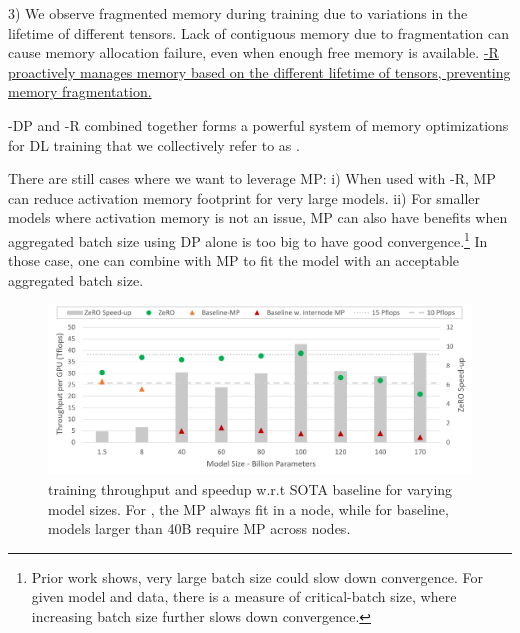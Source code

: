 3) We observe fragmented memory during training due to variations in the lifetime of different tensors. Lack of contiguous memory due to fragmentation can cause memory allocation failure, even when enough free memory is available. \uline{\name-R proactively manages memory based on the different lifetime of tensors, preventing memory fragmentation.}

\name-DP and \name-R combined together forms a powerful system of memory optimizations for DL training that we collectively refer to as \name.

There are still cases where we want to leverage MP: i) When used with \name-R, MP can reduce activation memory footprint for very large models. ii) For smaller models where activation memory is not an issue, MP can also have benefits when aggregated batch size using DP alone is too big to have good convergence.\footnote{Prior work \cite{DBLP:journals/corr/batch-scaling} shows, very large batch size could slow down convergence.  For given model and data, there is a measure of critical-batch size, where increasing batch size further slows down convergence.}  In those case, one can combine \name with MP to fit the model with an acceptable aggregated batch size.

\begin{figure}[t!]
 \begin{center}
 \includegraphics[width=1.0\columnwidth]{model_size_and_speedup.PNG}
 \caption{\name training throughput and speedup w.r.t SOTA baseline for varying model sizes.  For \name, the MP always fit in a node, while for baseline, models larger than 40B require MP across nodes.} 
 \label{fig:billion_parameter_speedup}
 \end{center}
 \end{figure}

